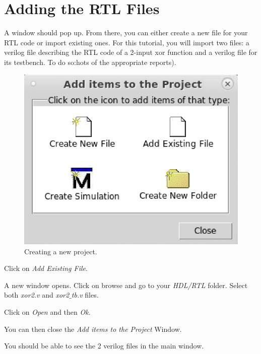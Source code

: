 \section{Adding the RTL Files}
A window should pop up. From there, you can either create a new file for your RTL code or import existing ones. For this tutorial, you will import two files: a verilog file describing the RTL code of a 2-input xor function and a verilog file for its testbench. To do so:hots of the appropriate reports).

\begin{enumerate}
	\parbox[t]{\dimexpr\textwidth-\leftmargin}{%
	\begin{figure}
		\vspace{0mm}
		\centering
		\vspace{-\baselineskip}
		\includegraphics[scale=0.5]{figures/modelsim/add_file}
		\caption{Creating a new project.}
		\label{addfile}
	\end{figure}
	\item Click on \textit{Add Existing File}.
\item A new window opens. Click on browse and go to your \textit{HDL/RTL} folder. Select both \textit{xor2.v} and \textit{xor2$\_$tb.v} files.
\item Click on \textit{Open} and then \textit{Ok}.
\item You can then close the \textit{Add items to the Project} Window.
\item You should be able to see the 2 verilog files in the main window.
}
\end{enumerate}



